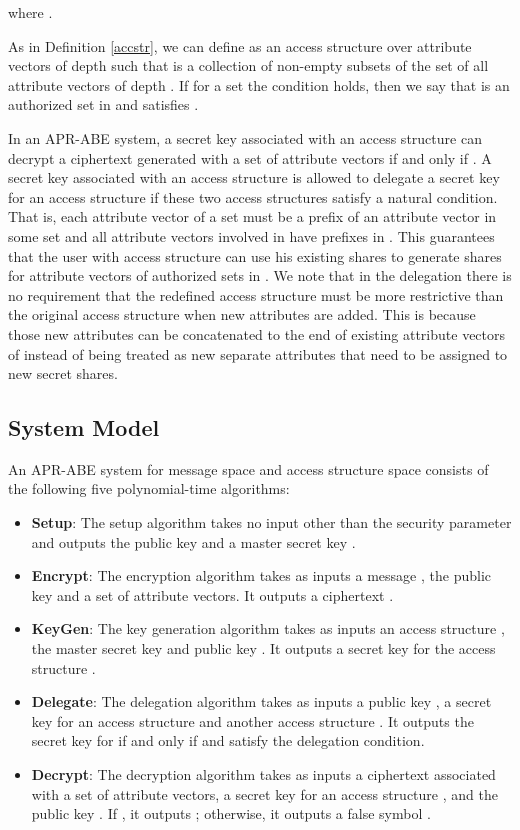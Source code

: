 \documentclass[twocolumn]{svjour3}          \smartqed  \usepackage{graphicx}
\begin{document}
where .

As in Definition \ref{accstr}, we can define  as an access structure over attribute vectors of depth  such that  is a
collection of non-empty subsets of the set of all attribute vectors of depth . If for a set  the condition  holds, then we
say that  is an authorized set in  and  satisfies .

In an APR-ABE system, a secret key associated with an access structure  
can decrypt a ciphertext generated with a set  of attribute vectors if and only if . A secret key associated with an access structure  is allowed to delegate a secret key for an access structure  if these two access structures satisfy a natural condition. That is, each attribute vector of a set  must be a prefix of an attribute vector in some set  and all attribute vectors involved in  have prefixes in . This guarantees that the user with access structure  can use his existing shares to generate shares  for attribute vectors of authorized sets in . We note that in the delegation there is no requirement that the redefined access structure  must be
more restrictive than the original access structure  when new attributes are added. This is because those new attributes can be concatenated to the end of existing attribute vectors of  instead of being treated as new separate attributes that need to be assigned to new secret shares.

\subsection{System Model}
An APR-ABE system for message space  and access structure space  consists of the following five
polynomial-time algorithms:

\begin{itemize}
  \item  \textbf{Setup}: The setup algorithm takes no input other than the security parameter  and outputs the
      public key  and a master secret key .
  \item  \textbf{Encrypt}: The encryption algorithm takes as inputs a message , the public key  and a set  of
      attribute vectors. It outputs a ciphertext .
  \item  \textbf{KeyGen}: The key generation algorithm takes as inputs an access structure , the master
      secret  key  and public key . It outputs a secret key  for the access structure .
  \item  \textbf{Delegate}: The delegation algorithm takes as inputs a public key , a secret key  for an
      access structure  and another access structure . It outputs the secret key  for  if and only if
       and  satisfy the delegation condition.
  \item  \textbf{Decrypt}: The decryption algorithm takes as inputs a ciphertext  associated with a set  of
      attribute vectors, a secret key for an access structure , and the public key . If , it outputs ;
      otherwise, it outputs a false symbol .
\end{itemize}
\end{document}
